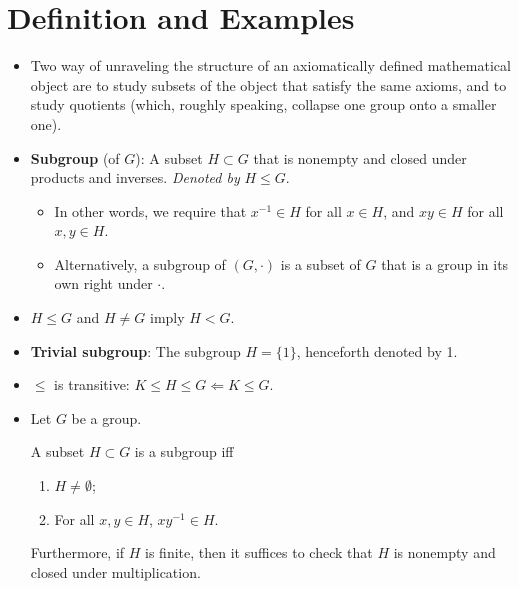 \documentclass[../notes.tex]{subfiles}
\begin{document}
\section{Definition and Examples}
\begin{itemize}
    \item Two way of unraveling the structure of an axiomatically defined mathematical object are to study subsets of the object that satisfy the same axioms, and to study quotients (which, roughly speaking, collapse one group onto a smaller one).
    \item \textbf{Subgroup} (of $G$): A subset $H\subset G$ that is nonempty and closed under products and inverses. \emph{Denoted by} $H\leq G$.
    \begin{itemize}
        \item In other words, we require that $x^{-1}\in H$ for all $x\in H$, and $xy\in H$ for all $x,y\in H$.
        \item Alternatively, a subgroup of $(G,\cdot)$ is a subset of $G$ that is a group in its own right under $\cdot$.
    \end{itemize}
    \item $H\leq G$ and $H\neq G$ imply $H<G$.
    \item \textbf{Trivial subgroup}: The subgroup $H=\{1\}$, henceforth denoted by 1.
    \item $\leq$ is transitive: $K\leq H\leq G\Longleftarrow K\leq G$.
    \item Let $G$ be a group.
    \begin{proposition}
        A subset $H\subset G$ is a subgroup iff
        \begin{enumerate}[label={\textup{\textbf{(\arabic*)}}}]
            \item $H\neq\emptyset$;
            \item For all $x,y\in H$, $xy^{-1}\in H$.
        \end{enumerate}
        Furthermore, if $H$ is finite, then it suffices to check that $H$ is nonempty and closed under multiplication.
    \end{proposition}
\end{itemize}
\end{document}
